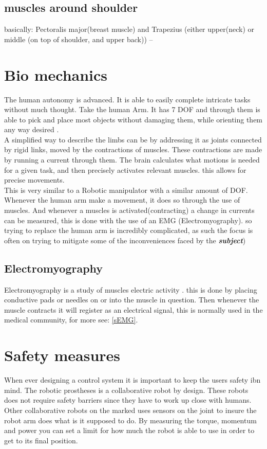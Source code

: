 \subsection{muscles around shoulder}
basically: Pectoralis major(breast muscle) and Trapezius (either upper(neck) or middle (on top of shoulder, and upper back)) -- 

\section{Bio mechanics} 
The human autonomy is advanced. It is able to easily complete intricate tasks without much thought. 
Take the human Arm. It has 7 DOF and through them is able to pick and place most objects without damaging them, while orienting them any way desired \cite{Redundan25:online}.\\ 
A simplified way to describe the limbs can be by addressing it as joints connected by rigid links, moved by the contractions of muscles. These contractions are made by running a current through them. The brain calculates what motions is needed for a given task, and then precisely activates relevant muscles. this allows for precise movements.\\
This is very similar to a Robotic manipulator with a similar amount of DOF.
Whenever the human arm make a movement, it does so through the use of muscles. And whenever a muscles is activated(contracting)  a change in currents can be measured, this is done with the use of an EMG (Electromyography). \cite{Electrom76:online} so trying to replace the human arm is incredibly complicated, as such the focus is often on trying to mitigate some of the inconveniences faced by the \textbf{\textit{subject}})

\subsection*{Electromyography}
Electromyography is a study of muscles electric activity \cite{Nerveled75:online}.
this is done by placing conductive pads or needles on or into the muscle in question. Then whenever the muscle contracts it will register as an electrical signal, this is normally used in the medical community, for more see: \ref{sEMG}.
\section*{Safety measures}
When ever designing a control system it is important to keep the users safety ibn mind. The robotic prostheses is a collaborative robot by design. These robots does not require safety barriers since they have to work up close with humans. Other collaborative robots on the marked uses sensors on the joint to insure the robot arm does what is it supposed to do. By measuring the torque, momentum and power you can set a limit for how much the robot is able to use in order to get to its final position. \cite{URsafety}\\ 

